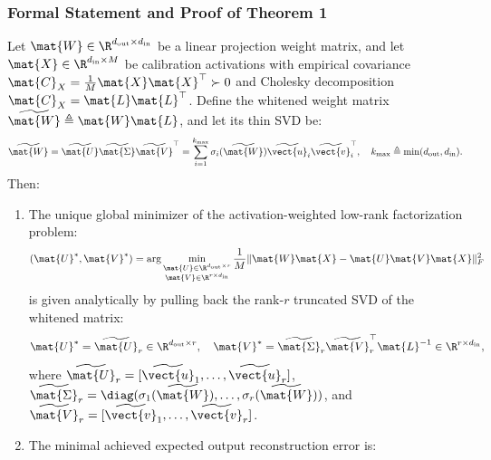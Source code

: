 \subsubsection{Formal Statement and Proof of Theorem 1}

\begin{theorem}
\label{thm:svdllm_v2_optimality}
Let $\mat{W} \in \R^{d_{\text{out}} \times d_{\text{in}}}$ be a linear projection weight matrix, and let $\mat{X} \in \R^{d_{\text{in}} \times M}$ be calibration activations with empirical covariance $\mat{C}_X = \frac{1}{M}\mat{X}\mat{X}^\top \succ 0$ and Cholesky decomposition $\mat{C}_X = \mat{L}\mat{L}^\top$. Define the whitened weight matrix $\widetilde{\mat{W}} \triangleq \mat{W} \mat{L}$, and let its thin SVD be:
\begin{equation}
\widetilde{\mat{W}} = \widetilde{\mat{U}} \widetilde{\mat{\Sigma}} \widetilde{\mat{V}}^\top = \sum_{i=1}^{k_{\max}} \sigma_i(\widetilde{\mat{W}}) \widetilde{\vect{u}}_i \widetilde{\vect{v}}_i^\top, \quad k_{\max} \triangleq \min(d_{\text{out}}, d_{\text{in}}).
\label{eq:whitened_svd}
\end{equation}
Then:
\begin{enumerate}
    \item The unique global minimizer of the activation-weighted low-rank factorization problem:
    \begin{equation}
    (\mat{U}^*, \mat{V}^*) = \arg\min_{\substack{\mat{U} \in \R^{d_{\text{out}} \times r} \\ \mat{V} \in \R^{r \times d_{\text{in}}}}} \frac{1}{M} \| \mat{W} \mat{X} - \mat{U} \mat{V} \mat{X} \|_F^2
    \label{eq:thm1_opt_problem}
    \end{equation}
    is given analytically by pulling back the rank-$r$ truncated SVD of the whitened matrix:
    \begin{equation}
    \mat{U}^* = \widetilde{\mat{U}}_r \in \R^{d_{\text{out}} \times r}, \quad \mat{V}^* = \widetilde{\mat{\Sigma}}_r \widetilde{\mat{V}}_r^\top \mat{L}^{-1} \in \R^{r \times d_{\text{in}}},
    \label{eq:thm1_closed_form}
    \end{equation}
    where $\widetilde{\mat{U}}_r = [\widetilde{\vect{u}}_1, \dots, \widetilde{\vect{u}}_r]$, $\widetilde{\mat{\Sigma}}_r = \diag(\sigma_1(\widetilde{\mat{W}}), \dots, \sigma_r(\widetilde{\mat{W}}))$, and $\widetilde{\mat{V}}_r = [\widetilde{\vect{v}}_1, \dots, \widetilde{\vect{v}}_r]$.
    \item The minimal achieved expected output reconstruction error is:

\end{enumerate}
\end{theorem}
